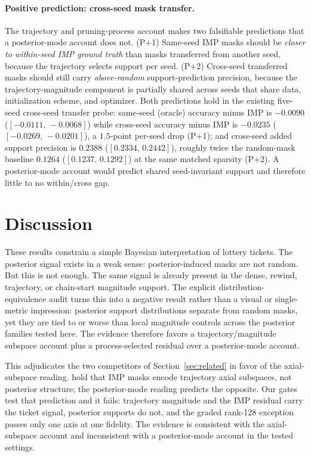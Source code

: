 \documentclass{article}
\begin{document}
\paragraph{Positive prediction: cross-seed mask transfer.}
The trajectory and pruning-process account makes two falsifiable
predictions that a posterior-mode account does not. (P+1) Same-seed IMP
masks should be \emph{closer to within-seed IMP ground truth} than masks
transferred from another seed, because the trajectory selects support per
seed. (P+2) Cross-seed transferred masks should still carry
\emph{above-random} support-prediction precision, because the
trajectory-magnitude component is partially shared across seeds that share
data, initialization scheme, and optimizer. Both predictions hold in the
existing five-seed cross-seed transfer probe: same-seed (oracle) accuracy
minus IMP is $-0.0090$ ($[-0.0111,\,-0.0068]$) while cross-seed accuracy
minus IMP is $-0.0235$ ($[-0.0269,\,-0.0201]$), a $1.5$-point per-seed
drop (P+1); and cross-seed added support precision is $0.2388$
($[0.2334,\,0.2442]$), roughly twice the random-mask baseline
$0.1264$ ($[0.1237,\,0.1292]$) at the same matched sparsity (P+2). A
posterior-mode account would predict shared seed-invariant support and
therefore little to no within/cross gap.

\section{Discussion}

These results constrain a simple Bayesian interpretation of lottery tickets.
The posterior signal exists in a weak sense: posterior-induced masks are not
random. But this is not enough. The same signal is already present in the dense,
rewind, trajectory, or chain-start magnitude support. The explicit
distribution-equivalence audit turns this into a negative result rather than a
visual or single-metric impression: posterior support distributions separate
from random masks, yet they are tied to or worse than local magnitude controls
across the posterior families tested here. The evidence therefore favors a
trajectory/magnitude subspace account plus a process-selected residual over a
posterior-mode account.

This adjudicates the two competitors of Section~\ref{sec:related} in favor of
the axial-subspace reading. \citet{paul2023unmasking} hold that IMP masks
encode trajectory axial subspaces, not posterior structure; the posterior-mode
reading predicts the opposite. Our gates test that prediction and it fails:
trajectory magnitude and the IMP residual carry the ticket signal, posterior
supports do not, and the graded rank-128 exception passes only one axis at one
fidelity. The evidence is consistent with the axial-subspace account and
inconsistent with a posterior-mode account in the tested settings.
\end{document}
